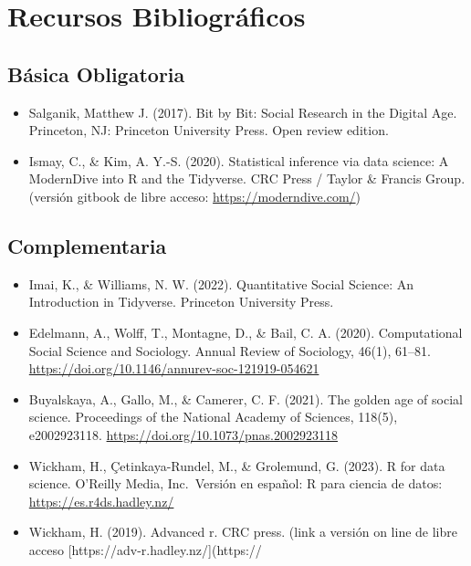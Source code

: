 \documentclass[11pt,letter,]{article}
\providecommand{\tightlist}{%
  \setlength{\itemsep}{0pt}\setlength{\parskip}{0pt}}
\begin{document}
\hypertarget{recursos-bibliogruxe1ficos}{%
\section{Recursos Bibliográficos}\label{recursos-bibliogruxe1ficos}}

\hypertarget{buxe1sica-obligatoria}{%
\subsection{Básica Obligatoria}\label{buxe1sica-obligatoria}}

\begin{itemize}
\tightlist
\item
  Salganik, Matthew J. (2017). Bit by Bit: Social Research in the
  Digital Age. Princeton, NJ: Princeton University Press. Open review
  edition.
\item
  Ismay, C., \& Kim, A. Y.-S. (2020). Statistical inference via data
  science: A ModernDive into R and the Tidyverse. CRC Press / Taylor \&
  Francis Group. (versión gitbook de libre acceso:
  \url{https://moderndive.com/})
\end{itemize}

\hypertarget{complementaria}{%
\subsection{Complementaria}\label{complementaria}}

\begin{itemize}
\tightlist
\item
  Imai, K., \& Williams, N. W. (2022). Quantitative Social Science: An
  Introduction in Tidyverse. Princeton University Press.
\item
  Edelmann, A., Wolff, T., Montagne, D., \& Bail, C. A. (2020).
  Computational Social Science and Sociology. Annual Review of
  Sociology, 46(1), 61--81.
  \url{https://doi.org/10.1146/annurev-soc-121919-054621}
\item
  Buyalskaya, A., Gallo, M., \& Camerer, C. F. (2021). The golden age of
  social science. Proceedings of the National Academy of Sciences,
  118(5), e2002923118. \url{https://doi.org/10.1073/pnas.2002923118}
\item
  Wickham, H., Çetinkaya-Rundel, M., \& Grolemund, G. (2023). R for data
  science. O'Reilly Media, Inc.~Versión en español: R para ciencia de
  datos: \url{https://es.r4ds.hadley.nz/}
\item
  Wickham, H. (2019). Advanced r. CRC press. (link a versión on line de
  libre acceso {[}https://adv-r.hadley.nz/{]}(https://
\end{itemize}
\end{document}
